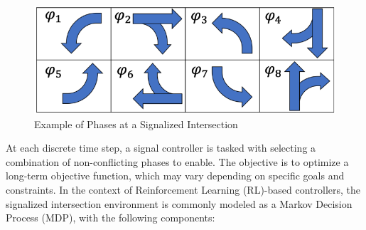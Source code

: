 \begin{figure}[h]
  \centering
  \includegraphics[width=0.6\linewidth]{images/background/intersection_phase.png}
  \caption{Example of Phases at a Signalized Intersection\cite{resco}}
  \label{fig:intersection-phase}
\end{figure}

At each discrete time step, a signal controller is tasked with selecting a combination of non-conflicting phases to enable. The objective is to optimize a long-term objective function, which may vary depending on specific goals and constraints. In the context of Reinforcement Learning (RL)-based controllers, the signalized intersection environment is commonly modeled as a Markov Decision Process (MDP), with the following components:

